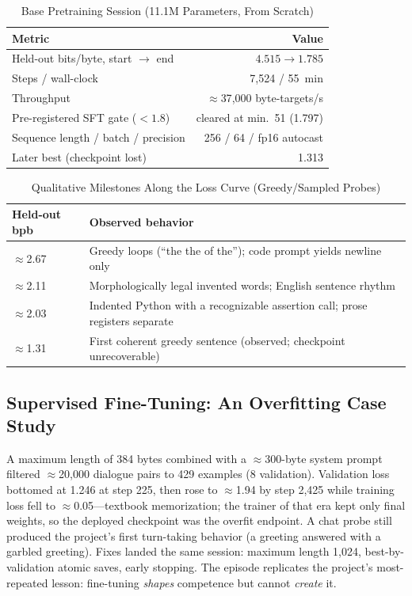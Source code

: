 \documentclass[journal]{IEEEtran}
\begin{document}
\begin{table}[!t]
\caption{Base Pretraining Session (11.1M Parameters, From Scratch)}
\label{tab:session}
\centering
\begin{tabular}{lr}
\toprule
Metric & Value \\
\midrule
Held-out bits/byte, start $\to$ end & $4.515 \to 1.785$ \\
Steps / wall-clock & 7{,}524 / 55~min \\
Throughput & $\approx$37{,}000 byte-targets/s \\
Pre-registered SFT gate ($<1.8$) & cleared at min.\ 51 (1.797) \\
Sequence length / batch / precision & 256 / 64 / fp16 autocast \\
Later best (checkpoint lost) & 1.313 \\
\bottomrule
\end{tabular}
\end{table}

\begin{table}[!t]
\caption{Qualitative Milestones Along the Loss Curve (Greedy/Sampled Probes)}
\label{tab:milestones}
\centering
\small
\begin{tabularx}{\columnwidth}{lY}
\toprule
Held-out bpb & Observed behavior \\
\midrule
$\approx$2.67 & Greedy loops (``the the of the''); code prompt yields newline only \\
$\approx$2.11 & Morphologically legal invented words; English sentence rhythm \\
$\approx$2.03 & Indented Python with a recognizable assertion call; prose registers separate \\
$\approx$1.31 & First coherent greedy sentence (observed; checkpoint unrecoverable) \\
\bottomrule
\end{tabularx}
\end{table}

\subsection{Supervised Fine-Tuning: An Overfitting Case Study}
A maximum length of 384 bytes combined with a $\approx$300-byte system prompt filtered $\approx$20{,}000 dialogue pairs to 429 examples (8 validation). Validation loss bottomed at 1.246 at step 225, then rose to $\approx$1.94 by step 2{,}425 while training loss fell to $\approx$0.05---textbook memorization; the trainer of that era kept only final weights, so the deployed checkpoint was the overfit endpoint. A chat probe still produced the project's first turn-taking behavior (a greeting answered with a garbled greeting). Fixes landed the same session: maximum length 1{,}024, best-by-validation atomic saves, early stopping. The episode replicates the project's most-repeated lesson: fine-tuning \emph{shapes} competence but cannot \emph{create} it.
\end{document}
